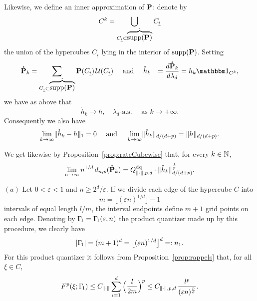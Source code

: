 Likewise, we define an inner approximation of $\mathbf{P}$: 
denote by
\[
C^k = \bigcup_{C_{\underline i} \subset \mathring{\overbrace{\operatorname{supp}(\mathbf{P})}}} C_{\underline i}
\]
the union of the hypercubes $C_{\underline i}$ lying  in
the interior of $\operatorname{supp}(\mathbf{P})$.
Setting
\begin{eqnarray*}
\begin{split}
  \mathring \Probb_k  = \sum_{\substack{C_{\underline i} \subset \opSuppP}}
  \Probb(C_{\underline i} ) \, \U(C_{\underline i} )\quad &\mbox{ and }\quad 
  \mathring h_k &= \frac{d\mathring \Probb_k}{d\lambda_d} = h_k \ind{C^k},
\end{split}
\end{eqnarray*}
we have as above that 
\[
\mathring h_k \to h, \quad \lambda_d\mbox{-}\text{a.s.}\quad\text{ as } k\to +\infty.
\]
Consequently we also have
\[
\lim_{k\to\infty} \lVert\mathring h_k-h\rVert_1 = 0 \quad\text{ and }\quad
\lim_{k\to\infty} \lVert\mathring h_k\rVert_{d/(d+p)} = \lVert h\rVert_{d/(d+p)}.
\]

We   get likewise by Proposition~\ref{prop:rateCubewise} that, for every
$k\in\mathbb{N}$,
\begin{equation}\label{eq:limit_ohk}
 \limn n^{1/d}\, d_{n,p}(\mathring \Probb_k) = \Qpn\cdot \normdp{\mathring
 h_k}^{\frac 1p}.
\end{equation}

\noindent $(a)$ Let $0 < \varepsilon < 1$ and $n \geq 2^d/\varepsilon$.
If we divide each edge of the hypercube $C$ into
\[
 m = \bigl\lfloor (\varepsilon n)^{1/d} \bigr\rfloor - 1
\]
intervals of equal length $l/m$, the interval endpoints define $m+1$ grid
points on each edge. Denoting by $\Gamma_{\!1} = \Gamma_{\!1}(\varepsilon, n)$ the product quantizer made up
by this procedure, we clearly have
\[
	\lvert\Gamma_{\!1}\rvert = (m+1)^d = \bigl\lfloor (\varepsilon n)^{1/d} \bigr\rfloor^d =:
	n_1.
\]
For this product quantizer it follows from  Proposition~\ref{prop:rappels} 
that, for all $\xi\in C$, 
 $$
  F^p(\xi; \Gamma_{\!1})  \leq C_{\lVert\cdot\rVert} \sum_{i=1}^d
  \Big(\frac{l}{2m}\Big)^p  \leq C_{\lVert\cdot\rVert,p,d}\, \frac{l^p}{(\varepsilon n)^{\frac pd}}.
$$


